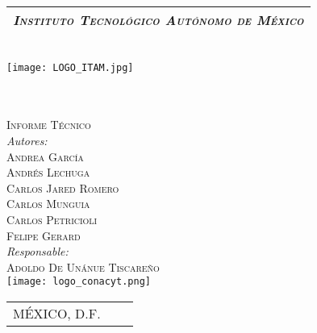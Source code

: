 \thispagestyle{empty}
\begin{titlepage}

	\begin{center}
	\vspace{60pt}
		\begin{tabular}{c}
			\Large \emph{\textsc{Instituto Tecnológico Autónomo de México}}\\
			\hline
		\end{tabular}\\
		\vspace{20pt}
		\texttt{[image: LOGO\_ITAM.jpg]}\\
		\vspace{20pt}
		{\huge \thetitle}\\
		\vspace{5pt}
		\vspace{8 pt}
		{\Large \thethesis } \\
		\vspace{3pt}
		
		\vspace{3pt}
{\noindent\Large\scshape Informe Técnico \\[0.3\baselineskip] }
		\vspace{3pt}
{\large \textit{Autores:}}\\
{\large \textsc{Andrea García }}\\ 
{\large \textsc{Andrés Lechuga}}\\ 
{\large \textsc{Carlos Jared Romero }}\\ 
{\large \textsc{Carlos Munguia}}\\ 
{\large \textsc{Carlos Petricioli }}\\ 
{\large \textsc{Felipe Gerard}}\\
	\vspace{15pt}
{\large \textit{Responsable:}}\\
{\large \textsc{Adoldo De Unánue Tiscareño}}\\
\vspace{10pt}
\texttt{[image: logo\_conacyt.png]}\\

		\vspace{5pt}
		\begin{tabular}{lcr}
			MÉXICO, D.F. & \hspace{60pt} & \theyear
		\end{tabular}
	\end{center}
\end{titlepage}



